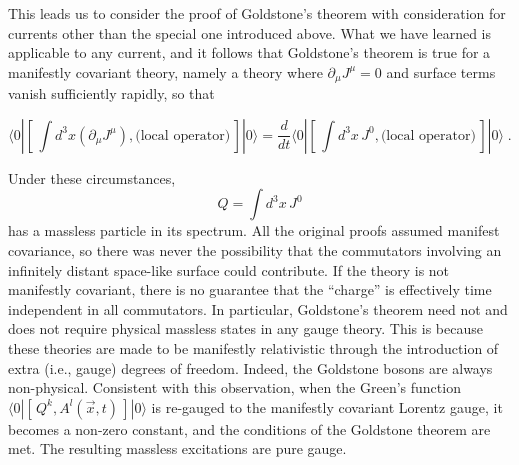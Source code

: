 \documentclass[12pt]{article}
\newcommand{\pa}{\partial}
\newcommand{\comm}[2]{\left[\,#1,#2\,\right]}
\newcommand{\ipop}[3]{\ensuremath{\langle#1 | #2 | #3\rangle}\xspace}
\begin{document}
    This leads us to consider the proof of Goldstone's theorem with
    consideration for currents other than the special one introduced
    above. What we have learned is applicable to any current,
    and it follows that Goldstone's theorem is true for a manifestly
    covariant theory, namely a theory where $\pa_{\mu} J^{\mu} = 0$
    and surface terms vanish sufficiently rapidly, so that

    \begin{equation*} \ipop{0}{\comm{\int d^3x (\pa_{\mu}
    J^{\mu})}{\text{(local operator)}}}{0} = \frac{d}{dt}
    \ipop{0}{\comm{\int d^3x\, J^0}{\text{(local operator)}}}{0} \;.
    \end{equation*}

 Under these circumstances,
\begin{equation*} Q = \int d^3x\, J^0 \end{equation*}
has a massless particle in its spectrum. All the original proofs
assumed manifest covariance, so there was never the possibility that
the commutators involving an infinitely distant space-like surface
could contribute. If the theory is not manifestly covariant, there is
no guarantee that the ``charge'' is effectively time independent in
all commutators.  In particular, Goldstone's theorem need not and does
not require physical massless states in any gauge theory.  This is
because these theories are made to be manifestly relativistic through
the introduction of extra (i.e., gauge) degrees of freedom. Indeed,
the Goldstone bosons are always non-physical.  Consistent with this
observation, when the Green's function
$\ipop{0}{\comm{Q^{k}}{A^{l}(\vec{x}, t)}}{0}$ is re-gauged to the
manifestly covariant Lorentz gauge, it becomes a non-zero constant,
and the conditions of the Goldstone theorem are met. The resulting
massless excitations are pure gauge.
\end{document}
